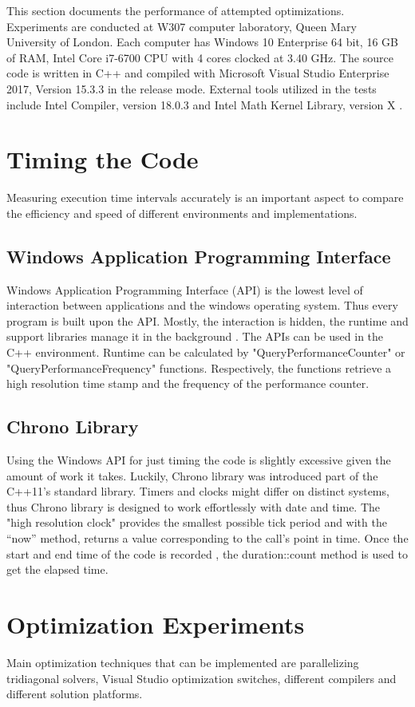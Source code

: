 \documentclass[12pt, oneside]{book}
\theoremstyle{plain}
\theoremstyle{definition}
\begin{document}
This section documents the performance of attempted optimizations. Experiments  are  conducted  at  W307 computer laboratory, Queen Mary University of London.  Each computer has Windows 10 Enterprise 64 bit, 16 GB of RAM, Intel Core i7-6700 CPU with 4 cores clocked at 3.40 GHz.  The source code is written in C++ and compiled with Microsoft Visual Studio Enterprise 2017, Version 15.3.3 in the release mode. External tools  utilized  in  the  tests  include   Intel Compiler, version 18.0.3 and Intel Math  Kernel  Library, version X .  

\section{Timing the Code}
Measuring execution time intervals accurately is an important aspect to compare the efficiency and speed of different environments and implementations.

\subsection{Windows Application Programming Interface}
Windows Application Programming Interface (API) is the lowest level of interaction between applications and the windows operating system. Thus every program is built upon  the API. Mostly, the interaction is hidden, the runtime and support libraries manage it in the background \cite{windows}. The APIs can be used in the C++ environment. Runtime can be calculated by "QueryPerformanceCounter" or "QueryPerformanceFrequency"  functions. Respectively, the functions retrieve a high resolution time stamp and the frequency of the performance counter. 

\subsection{Chrono Library}
Using the Windows API for just timing the code is slightly excessive given the amount of work it takes. Luckily, Chrono library was introduced part of the C++11’s standard library.  Timers and clocks might differ on distinct systems, thus Chrono library is designed to work effortlessly with date and time. The "high resolution clock" provides the smallest possible tick period and with the “now” method, returns a value corresponding to the call’s point in time.  Once the start and end time of the code is recorded ,  the duration::count method is used to get the elapsed time.

\section{Optimization Experiments}
Main optimization techniques that can be implemented are parallelizing tridiagonal solvers, Visual Studio optimization switches, different compilers and different solution platforms.
\end{document}
